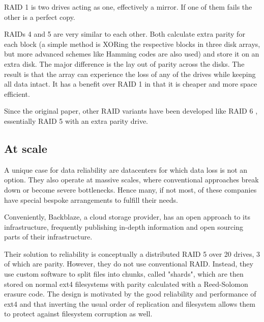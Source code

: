             RAID 1 is two drives acting as one, effectively a mirror. If one of
            them fails the other is a perfect copy.

            RAIDs 4 and 5 are very similar to each other. Both calculate extra parity for
            each block (a simple method is XORing the respective blocks in
            three disk arrays, but more advanced schemes like Hamming codes are
            also used) and store it on an extra disk. The major difference is
            the lay out of parity across the disks. The result is that the array
            can experience the loss of any of the drives while keeping all
            data intact. It has a benefit over RAID 1 in that it is
            cheaper and more space efficient.

            Since the original paper, other RAID variants have been developed
            like RAID 6 \cite{RAID6}, essentially RAID 5 with an extra parity drive.

        \subsection{At scale}

            A unique case for data reliability are datacenters for which data
            loss is not an option. They also operate at massive scales, where
            conventional approaches break down or become severe bottlenecks.
            Hence many, if not most, of these companies have special bespoke
            arrangements to fulfill their needs.

            Conveniently, Backblaze, a cloud storage provider, has an open
            approach to its infrastructure, frequently publishing in-depth
            information and open sourcing parts of their infrastructure.

            Their solution to reliability \cite{Backblaze_arch} is conceptually
            a distributed RAID 5 over 20 drives, 3 of which are parity.
            However, they do not use conventional RAID.  Instead, they use
            custom software to split files into chunks, called "shards", which
            are then stored on normal ext4 filesystems with parity calculated
            with a Reed-Solomon erasure code. The design is motivated by the
            good reliability and performance of ext4 and that inverting the
            usual order of replication and filesystem allows them to protect
            against filesystem corruption as well.


